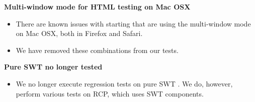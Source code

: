 \textbf{Multi-window mode for HTML testing on Mac OSX}
\begin{itemize}
\item There are known issues with starting \gdauts{} that are using the multi-window mode on Mac OSX, both in Firefox and Safari.
\item We have removed these combinations from our tests.
\end{itemize}

\textbf{Pure SWT \gdauts{} no longer tested}
\begin{itemize}
\item We no longer execute regression tests on pure SWT \gdauts{}. We do, however, perform various tests on RCP, which uses SWT components. 
\end{itemize}
